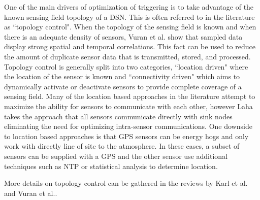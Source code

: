 One of the main drivers of optimization of triggering is to take advantage of the known sensing field topology of a DSN. This is often referred to in the literature as ``topology control"\cite{santi2005topology}. When the topology of the sensing field is known and when there is an adequate density of sensors, Vuran et al. show that sampled data display strong spatial and temporal correlations\cite{vuran2004spatio}. This fact can be used to reduce the amount of duplicate sensor data that is transmitted, stored, and processed. Topology control is generally split into two categories, ``location  driven" where the location of the sensor is known and ``connectivity driven" which aims to dynamically activate or deactivate sensors to provide complete coverage of a sensing field. Many of the location based approaches in the literature attempt  to maximize the ability for sensors to communicate with each other, however Laha takes the approach that all sensors communicate directly with sink nodes eliminating the need for optimizing intra-sensor communications. One downside to location based approaches is that GPS sensors can be energy hogs and only work with directly line of site to the atmosphere. In these cases, a subset of sensors can be supplied with a GPS and the other sensor use additional techniques such as NTP or statistical analysis to determine location\cite{langendoen2003distributed}.

More details on topology control can be gathered in the reviews by Karl et al.\cite{karl2007protocols} and Vuran et al.\cite{vuran2004spatio}.







